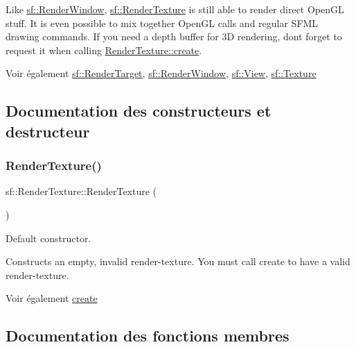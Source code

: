 Like \hyperlink{classsf_1_1RenderWindow}{sf\+::\+Render\+Window}, \hyperlink{classsf_1_1RenderTexture}{sf\+::\+Render\+Texture} is still able to render direct Open\+GL stuff. It is even possible to mix together Open\+GL calls and regular S\+F\+ML drawing commands. If you need a depth buffer for 3D rendering, don\textquotesingle{}t forget to request it when calling \hyperlink{classsf_1_1RenderTexture_aefbb76eb3b87e368ab974b2660931ccb}{Render\+Texture\+::create}.

\begin{DoxySeeAlso}{Voir également}
\hyperlink{classsf_1_1RenderTarget}{sf\+::\+Render\+Target}, \hyperlink{classsf_1_1RenderWindow}{sf\+::\+Render\+Window}, \hyperlink{classsf_1_1View}{sf\+::\+View}, \hyperlink{classsf_1_1Texture}{sf\+::\+Texture} 
\end{DoxySeeAlso}


\subsection{Documentation des constructeurs et destructeur}
\mbox{\label{classsf_1_1RenderTexture_a19ee6e5b4c40ad251803389b3953a9c6}} 
\subsubsection{\texorpdfstring{Render\+Texture()}{RenderTexture()}}
{\footnotesize\ttfamily sf\+::\+Render\+Texture\+::\+Render\+Texture (\begin{DoxyParamCaption}{ }\end{DoxyParamCaption})}



Default constructor. 

Constructs an empty, invalid render-\/texture. You must call create to have a valid render-\/texture.

\begin{DoxySeeAlso}{Voir également}
\hyperlink{classsf_1_1RenderTexture_aefbb76eb3b87e368ab974b2660931ccb}{create} 
\end{DoxySeeAlso}


\subsection{Documentation des fonctions membres}
\mbox{\label{classsf_1_1RenderTexture_aefbb76eb3b87e368ab974b2660931ccb}} 
